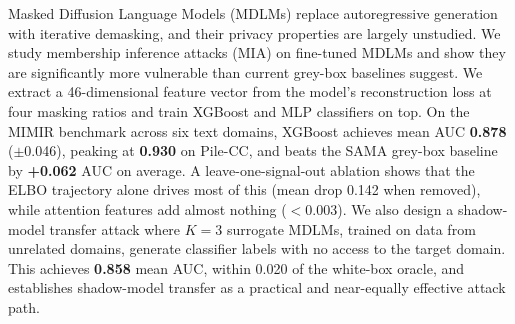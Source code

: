 Masked Diffusion Language Models (MDLMs) replace autoregressive generation with
iterative demasking, and their privacy properties are largely unstudied.
We study membership inference attacks (MIA) on fine-tuned MDLMs and show they
are significantly more vulnerable than current grey-box baselines suggest.
We extract a 46-dimensional feature vector from the model's reconstruction loss
at four masking ratios and train XGBoost and MLP classifiers on top.
On the MIMIR benchmark across six text domains, XGBoost achieves mean AUC
\textbf{0.878} ($\pm$0.046), peaking at \textbf{0.930} on Pile-CC, and
beats the SAMA grey-box baseline by \textbf{+0.062} AUC on average.
A leave-one-signal-out ablation shows that the ELBO trajectory alone drives
most of this (mean drop 0.142 when removed), while attention features add
almost nothing ($<$0.003).
We also design a shadow-model transfer attack where $K=3$ surrogate MDLMs,
trained on data from unrelated domains, generate classifier labels with
no access to the target domain. This achieves \textbf{0.858} mean AUC,
within 0.020 of the white-box oracle, and establishes shadow-model transfer
as a practical and near-equally effective attack path.
